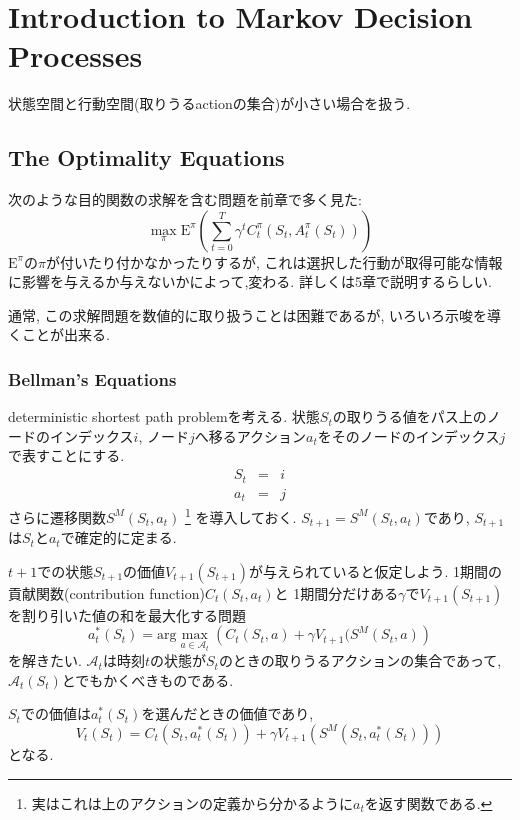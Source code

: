 \documentclass[11pt]{jsbook}
\begin{document}
\chapter{Introduction to Markov Decision Processes}
状態空間と行動空間(取りうるactionの集合)が小さい場合を扱う.
\section{The Optimality Equations}
次のような目的関数の求解を含む問題を前章で多く見た:
\begin{equation}
	\max_{\pi} \mathrm{E}^{\pi} \left( \sum_{t=0}^{T} \gamma ^t C_t^{\pi}(S_t, A_t^{\pi}(S_t)) \right)
\end{equation}
$\mathrm{E}^{\pi}$の$\pi$が付いたり付かなかったりするが,
これは選択した行動が取得可能な情報に影響を与えるか与えないかによって,変わる.
詳しくは5章で説明するらしい.

通常, この求解問題を数値的に取り扱うことは困難であるが,
いろいろ示唆を導くことが出来る.

\subsection{Bellman's Equations}
deterministic shortest path problemを考える.
状態$S_t$の取りうる値をパス上のノードのインデックス$i$,
ノード$j$へ移るアクション$a_t$をそのノードのインデックス$j$で表すことにする.
\begin{eqnarray*}
	S_t &=& i \\
	a_t &=& j 
\end{eqnarray*}
さらに遷移関数$S^M(S_t,a_t)$
\footnote{実はこれは上のアクションの定義から分かるように$a_t$を返す関数である.}
を導入しておく.
$S_{t+1} = S^M(S_t, a_t)$であり, $S_{t+1}$は$S_t$と$a_t$で確定的に定まる.

$t+1$での状態$S_{t+1}$の価値$V_{t+1}(S_{t+1})$が与えられていると仮定しよう.
1期間の貢献関数(contribution function)$C_t(S_t, a_t)$と
1期間分だけある$\gamma $で$V_{t+1}(S_{t+1})$を割り引いた値の和を最大化する問題
\begin{equation}
	a_t^{*}(S_t) = \mathrm{arg} \max_{a \in \mathcal{A}_t} \left(C_t(S_t,a) + \gamma V_{t+1}(S^M(S_{t}, a) \right)
\end{equation}
を解きたい. $\mathcal{A}_t$は時刻$t$の状態が$S_t$のときの取りうるアクションの集合であって,
$\mathcal{A}_t(S_t)$とでもかくべきものである.

$S_t$での価値は$a_t^{*}(S_t)$を選んだときの価値であり,
\begin{equation}
	V_t(S_t) = C_t(S_t,a_t^{*}(S_t)) + \gamma V_{t+1}\left(S^M(S_{t}, a_t^{*}(S_t))\right)
\end{equation}
となる.
\end{document}
